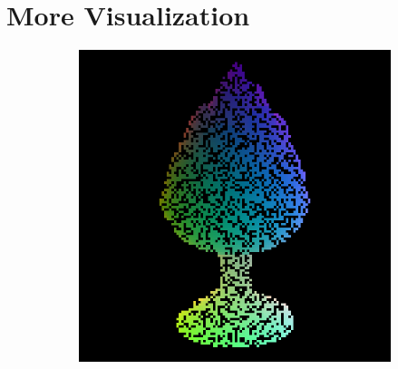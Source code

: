 
\chapter{More Visualization} %

\label{AppendixB} %

\newpage
\begin{figure}
	\centering
	\captionsetup{width=\linewidth}
	\begin{subfigure}[b]{0.24\linewidth}
		\includegraphics[width=\linewidth]{./Figures/gcnn_synthetic/fancy_eval_2_point_cloud_noise.png}
	\end{subfigure}
	\begin{subfigure}[b]{0.24\linewidth}

\end{subfigure}
\end{figure}
